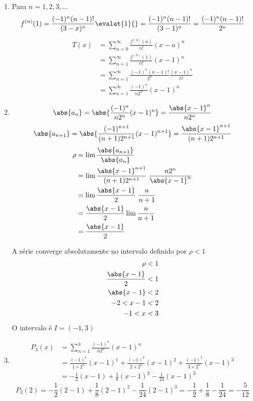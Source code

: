 \documentclass[a4paper,12pt,fleqn]{article}
\begin{document}
\begin{answer}
\begin{enumerate}[label=\alph*)]
  \item
  Para $n=1, 2, 3, \dots$
  \[
    f^{(n)}(1)
    = \frac{(-1)^n(n-1)!}{(3-x)^n}\evalat{1}{}
    = \frac{(-1)^n(n-1)!}{(3-1)^n}
    = \frac{(-1)^n(n-1)!}{2^n}
  \]
  \begin{align*}
    T(x)
    & = \sum_{n=0}^\infty \frac{f^{(n)}(a)}{n!}(x-a)^n \\
    & = \sum_{n=1}^\infty \frac{f^{(n)}(1)}{n!}(x-1)^n \\
    & = \sum_{n=1}^\infty \frac{(-1)^n(n-1)!}{2^n} \frac{(x-1)^n}{n!} \\
    & = \sum_{n=1}^\infty \frac{(-1)^n}{n2^n} (x-1)^n
  \end{align*}

  \item
  \[
    \abs{a_n}
    = \abs{\frac{(-1)^n}{n2^n} (x-1)^n}
    = \frac{\abs{x-1}^n}{n2^n}
  \]
  \[
    \abs{a_{n+1}}
    = \abs{\frac{(-1)^{n+1}}{(n+1)2^{n+1}} (x-1)^{n+1}}
    = \frac{\abs{x-1}^{n+1}}{(n+1)2^{n+1}}
  \]
  \begin{align*}
    \rho
    & = \lim \frac{\abs{a_{n+1}}}{\abs{a_n}} \\
    & = \lim \frac{\abs{x-1}^{n+1}}{(n+1)2^{n+1}} \; \frac{n2^n}{\abs{x-1}^n} \\
    & = \lim \frac{\abs{x-1}}{2} \; \frac{n}{n+1} \\
    & = \frac{\abs{x-1}}{2} \lim \frac{n}{n+1} \\
    & = \frac{\abs{x-1}}{2}
  \end{align*}

  \vspace{\baselineskip}
  A série converge absolutamente no intervalo definido por $\rho<1$
  \begin{align*}
    \rho & < 1 \\
    \frac{\abs{x-1}}{2} & < 1 \\
    \abs{x-1} & < 2 \\
    -2 < x-1 & < 2 \\
    -1 < x & < 3
  \end{align*}
  O intervalo é $I=(-1, 3)$

  \item
  \begin{align*}
    P_3(x)
    & = \sum_{n=1}^3 \frac{(-1)^n}{n2^n} (x-1)^n \\
    & = \frac{(-1)^1}{1\times 2^1} (x-1)^1
      + \frac{(-1)^2}{2\times 2^2} (x-1)^2
      + \frac{(-1)^3}{3\times 2^3} (x-1)^3 \\
    & = - \frac{1}{2}  (x-1)
        + \frac{1}{8}  (x-1)^2
        - \frac{1}{24} (x-1)^3
  \end{align*}
  \[
    P_3(2)
    = - \frac{1}{2}  (2-1)
      + \frac{1}{8}  (2-1)^2
      - \frac{1}{24} (2-1)^3
      = - \frac{1}{2} + \frac{1}{8} - \frac{1}{24}
      = -\frac{5}{12}
  \]


\end{enumerate}
\end{answer}
\end{document}
